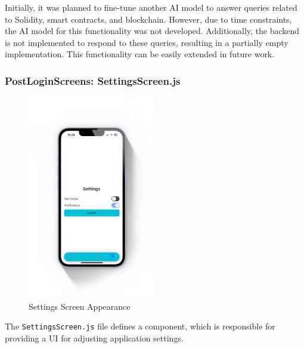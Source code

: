 Initially, it was planned to fine-tune another AI model to answer queries related to Solidity, smart contracts, and blockchain. However, due to time constraints, the AI model for this functionality was not developed. Additionally, the backend is not implemented to respond to these queries, resulting in a partially empty implementation. This functionality can be easily extended in future work.

\subsubsection{PostLoginScreens: SettingsScreen.js}

\begin{figure}[!ht]
    \centering
    \includegraphics[width=0.5\textwidth]{LATEX/Appendices/Images/Software/Frontend/settings_screen.png}
    \caption{Settings Screen Appearance}
    \label{fig:settings screen}
\end{figure}

The \texttt{SettingsScreen.js} file defines a component, which is responsible for providing a UI for adjusting application settings.

